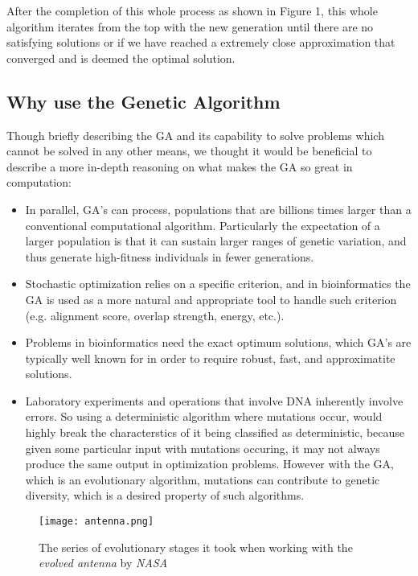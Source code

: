 After the completion of this whole process as shown in Figure 1, this whole algorithm iterates from the top with the new generation until there are no satisfying solutions or if we have reached a extremely close approximation that converged and is deemed the optimal solution.

\subsection{Why use the Genetic Algorithm}

Though briefly describing the GA and its capability to solve problems which cannot be solved in any other means, we thought it would be beneficial to describe a more in-depth reasoning on what makes the GA so great in computation: 

\begin{itemize}

\item In parallel, GA's can process, populations that are billions times larger than a conventional computational algorithm. Particularly the expectation of a larger population is that it can sustain larger ranges of genetic variation, and thus generate high-fitness individuals in fewer generations. 

\item Stochastic optimization relies on a specific criterion, and in bioinformatics the GA is used as a more natural and appropriate tool to handle such criterion (e.g. alignment score, overlap strength, energy, etc.).

\item Problems in bioinformatics need the exact optimum solutions, which GA's are typically well known for in order to require robust, fast, and approximatite solutions. 

\item Laboratory experiments and operations that involve DNA inherently involve errors. So using a deterministic algorithm where mutations occur, would highly break the characterstics of it being classified as deterministic, because given some particular input with mutations occuring, it may not always produce the same output in optimization problems. However with the GA, which is an evolutionary algorithm, mutations can contribute to genetic diversity, which is a desired property of such algorithms.  

\end{itemize}

\begin{figure}[h]
\centering
\texttt{[image: antenna.png]}
\caption{The series of evolutionary stages it took when working with the \emph{evolved antenna} by \emph{NASA}}
\end{figure}

